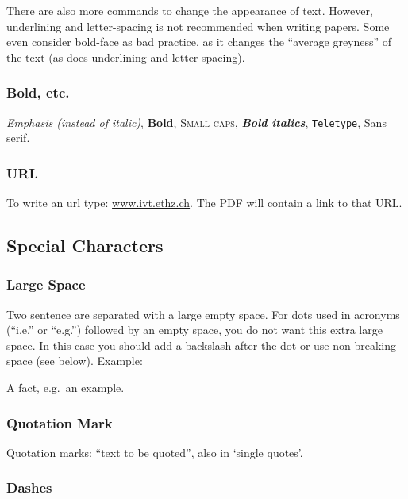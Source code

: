 \documentclass[numbered]{ivt-style/standard}\usepackage[]{graphicx}\usepackage[]{xcolor}
\begin{document}
There are also more commands to change the appearance of text.
However, underlining and letter-spacing
is not recommended when writing papers.
Some even consider bold-face as bad practice, as it changes
the ``average greyness'' of the text
(as does underlining and letter-spacing).

\subsubsection{Bold, etc.}

\emph{Emphasis (instead of italic)}, \textbf{Bold},
\textsc{Small caps}, \textbf{\textit{Bold italics}},
\texttt{Teletype}, \textsf{Sans serif}.

\subsubsection{URL}

To write an url type: \url{www.ivt.ethz.ch}.
The PDF will contain a link to that URL.

\subsection{Special Characters}

\subsubsection{Large Space}

Two sentence are separated with a large empty space. For dots used in
acronyms (``i.e.'' or ``e.g.'') followed by an empty space, you do not
want this extra large space. In this case you should add a backslash
after the dot
or use non-breaking space (see below).
Example:

A fact, e.g.\ an example.

\subsubsection{Quotation Mark}

Quotation marks: ``text to be quoted'', also in `single quotes'.

\subsubsection{Dashes}
\end{document}
